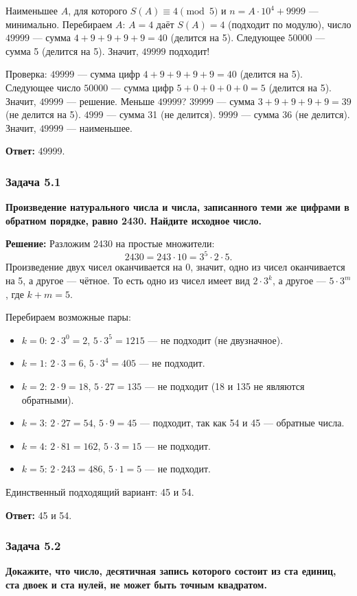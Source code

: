 \documentclass[12pt, a4paper]{article}
\begin{document}
Наименьшее $A$, для которого $S(A) \equiv 4 \pmod{5}$ и $n = A \cdot 10^4 + 9999$ — минимально. Перебираем $A$: $A=4$ даёт $S(A)=4$ (подходит по модулю), число $49999$ — сумма $4+9+9+9+9=40$ (делится на 5). Следующее $50000$ — сумма 5 (делится на 5). Значит, $49999$ подходит!

Проверка: $49999$ — сумма цифр $4+9+9+9+9=40$ (делится на 5). Следующее число $50000$ — сумма цифр $5+0+0+0+0=5$ (делится на 5). Значит, $49999$ — решение. Меньше $49999$? $39999$ — сумма $3+9+9+9+9=39$ (не делится на 5). $4999$ — сумма 31 (не делится). $9999$ — сумма 36 (не делится). Значит, $49999$ — наименьшее.

\textbf{Ответ:} 49999.

\subsubsection*{Задача 5.1}
\textbf{Произведение натурального числа и числа, записанного теми же цифрами в обратном порядке, равно 2430. Найдите исходное число.}

\textbf{Решение:}
Разложим 2430 на простые множители:
\[
2430 = 243 \cdot 10 = 3^5 \cdot 2 \cdot 5.
\]
Произведение двух чисел оканчивается на 0, значит, одно из чисел оканчивается на 5, а другое — чётное. То есть одно из чисел имеет вид $2 \cdot 3^k$, а другое — $5 \cdot 3^m$, где $k + m = 5$.

Перебираем возможные пары:
\begin{itemize}
    \item $k = 0$: $2 \cdot 3^0 = 2$, $5 \cdot 3^5 = 1215$ — не подходит (не двузначное).
    \item $k = 1$: $2 \cdot 3 = 6$, $5 \cdot 3^4 = 405$ — не подходит.
    \item $k = 2$: $2 \cdot 9 = 18$, $5 \cdot 27 = 135$ — не подходит (18 и 135 не являются обратными).
    \item $k = 3$: $2 \cdot 27 = 54$, $5 \cdot 9 = 45$ — подходит, так как 54 и 45 — обратные числа.
    \item $k = 4$: $2 \cdot 81 = 162$, $5 \cdot 3 = 15$ — не подходит.
    \item $k = 5$: $2 \cdot 243 = 486$, $5 \cdot 1 = 5$ — не подходит.
\end{itemize}
Единственный подходящий вариант: 45 и 54.

\textbf{Ответ:} 45 и 54.

\subsubsection*{Задача 5.2}
\textbf{Докажите, что число, десятичная запись которого состоит из ста единиц, ста двоек и ста нулей, не может быть точным квадратом.}
\end{document}
